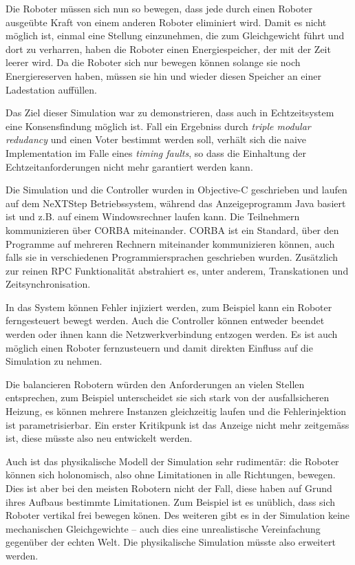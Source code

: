 Die Roboter m{\"{u}}ssen sich nun so bewegen, dass jede durch einen Roboter ausge{\"{u}}bte Kraft von einem
anderen Roboter eliminiert wird. Damit es nicht m{\"{o}}glich ist, einmal eine Stellung einzunehmen,
die zum Gleichgewicht f{\"{u}}hrt und dort zu verharren, haben die Roboter einen Energiespeicher, der
mit der Zeit leerer wird. Da die Roboter sich nur bewegen k{\"{o}}nnen solange sie noch Energiereserven haben, 
m{\"{u}}ssen sie hin und wieder diesen Speicher an einer Ladestation auff{\"{u}}llen.

Das Ziel dieser Simulation war zu demonstrieren, dass auch in Echtzeitsystem eine Konsensfindung m{\"{o}}glich
ist. Fall ein Ergebniss durch \textit{triple modular redudancy} und einen Voter bestimmt werden soll, 
verh{\"{a}}lt sich die naive Implementation im Falle eines \textit{timing faults}, so dass die
Einhaltung der Echtzeitanforderungen nicht mehr garantiert werden kann. 

Die Simulation und die Controller wurden in Objective-C geschrieben und laufen auf dem NeXTStep Betriebssystem, 
w{\"{a}}hrend das Anzeigeprogramm Java basiert ist und z.B. auf
einem Windowsrechner laufen kann. Die Teilnehmern kommunizieren {\"{u}}ber CORBA 
miteinander\cite{predictablecorba}. CORBA ist ein Standard, {\"{u}}ber den Programme auf
mehreren Rechnern miteinander kommunizieren k{\"{o}}nnen, auch falls sie in verschiedenen Programmiersprachen 
geschrieben wurden. Zus{\"{a}}tzlich zur reinen RPC Funktionalit{\"{a}}t abstrahiert es, unter anderem, 
Transkationen und Zeitsynchronisation.

In das System k{\"{o}}nnen Fehler injiziert werden, zum Beispiel kann ein Roboter ferngesteuert bewegt werden. Auch
die Controller k{\"{o}}nnen entweder beendet werden oder ihnen kann die Netzwerkverbindung entzogen werden. Es ist
auch m{\"{o}}glich einen Roboter fernzusteuern und damit direkten Einfluss auf die Simulation zu nehmen.

Die balancieren Robotern w{\"{u}}rden den Anforderungen an vielen Stellen entsprechen, zum Beispiel
unterscheidet sie sich stark von der ausfallsicheren Heizung, es k{\"{o}}nnen mehrere Instanzen
gleichzeitig laufen und die Fehlerinjektion ist parametrisierbar. Ein erster Kritikpunk ist das Anzeige
nicht mehr zeitgem{\"{a}}ss ist, diese m{\"{u}}sste also neu entwickelt werden.

Auch ist das physikalische Modell der Simulation sehr rudiment{\"{a}}r: die Roboter k{\"{o}}nnen sich
holonomisch, also ohne Limitationen in alle Richtungen, bewegen. Dies ist aber bei den meisten Robotern
nicht der Fall, diese haben auf Grund ihres Aufbaus bestimmte Limitationen. Zum Beispiel ist es un{\"{u}}blich, 
dass sich Roboter vertikal frei bewegen k{\"{o}}nen. Des weiteren gibt es in der Simulation keine mechanischen 
Gleichgewichte -- auch dies eine unrealistische Vereinfachung gegen{\"{u}}ber der echten Welt. Die
physikalische Simulation m{\"{u}}sste also erweitert werden.

